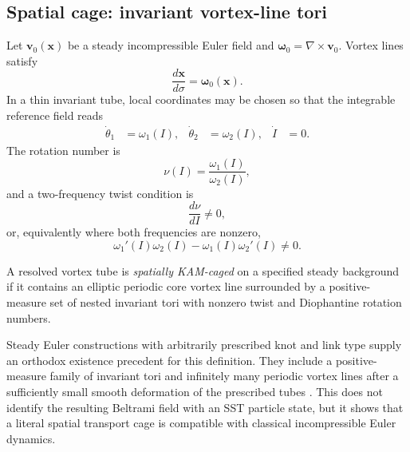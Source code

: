 \subsection{Spatial cage: invariant vortex-line tori}
\label{subsec:rt_kam_spatial_cage}

Let \(\mathbf v_0(\mathbf x)\) be a steady incompressible Euler field and
\(\boldsymbol\omega_0=\nabla\times\mathbf v_0\).  Vortex lines satisfy
\begin{equation}
    \frac{d\mathbf x}{d\sigma}
    =
    \boldsymbol\omega_0(\mathbf x).
    \label{eq:rt_kam_vortex_line_flow}
\end{equation}
In a thin invariant tube, local coordinates may be chosen so that the
integrable reference field reads
\begin{align}
    \dot\theta_1&=\omega_1(I),
    &
    \dot\theta_2&=\omega_2(I),
    &
    \dot I&=0.
    \label{eq:rt_kam_spatial_integrable_coordinates}
\end{align}
The rotation number is
\begin{equation}
    \nu(I)
    =
    \frac{\omega_1(I)}{\omega_2(I)},
    \label{eq:rt_kam_spatial_rotation_number}
\end{equation}
and a two-frequency twist condition is
\begin{equation}
    \frac{d\nu}{dI}\neq0,
    \label{eq:rt_kam_spatial_twist}
\end{equation}
or, equivalently where both frequencies are nonzero,
\begin{equation}
    \omega_1'(I)\omega_2(I)
    -
    \omega_1(I)\omega_2'(I)
    \neq0.
    \label{eq:rt_kam_spatial_wronskian_twist}
\end{equation}

\begin{definition}
A resolved vortex tube is \emph{spatially KAM-caged} on a specified steady
background if it contains an elliptic periodic core vortex line surrounded by
a positive-measure set of nested invariant tori with nonzero twist and
Diophantine rotation numbers.
\label{def:rt_spatial_kam_cage}
\end{definition}

Steady Euler constructions with arbitrarily prescribed knot and link type
supply an orthodox existence precedent for this definition.  They include a
positive-measure family of invariant tori and infinitely many periodic vortex
lines after a sufficiently small smooth deformation of the prescribed tubes
\cite{EncisoPeraltaSalas2015}.  This does not identify the resulting Beltrami
field with an SST particle state, but it shows that a literal spatial
transport cage is compatible with classical incompressible Euler dynamics.

